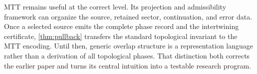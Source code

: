 \documentclass[11pt]{article}
\theoremstyle{definition}
\theoremstyle{remark}
\begin{document}
MTT remains useful at the correct level.  Its projection and admissibility
framework can organize the source, retained sector, continuation, and error
data.  Once a selected source emits the complete phase record and the
intertwining certificate, \cref{thm:pullback} transfers the standard
topological invariant to the MTT encoding.  Until then, generic overlap
structure is a representation language rather than a derivation of all
topological phases.  That distinction both corrects the earlier paper and
turns its central intuition into a testable research program.



\end{document}
